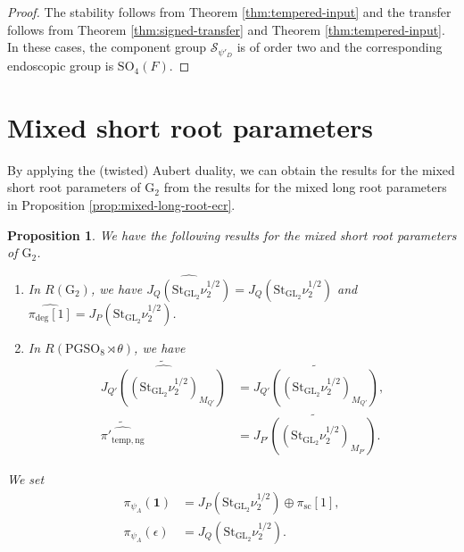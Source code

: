 \documentclass[12pt]{amsart}
\theoremstyle{definition}
\theoremstyle{plain}
\newtheorem{proposition}[definition]{Proposition}
\theoremstyle{remark}
\def\GL{\mathrm{GL}}
\def\SO{\mathrm{SO}}
\def\PGSO{\mathrm{PGSO}}
\newcommand{\cS}{\mathcal{S}}
\numberwithin{equation}{section}
\newcommand{\temp}{\mathrm{temp}}
\newcommand{\rG}{\mathrm{G}}
\newcommand{\St}{\mathrm{St}}
\begin{document}
\begin{proof}
      The stability follows from Theorem \ref{thm:tempered-input} and the transfer follows from Theorem \ref{thm:signed-transfer} and Theorem \ref{thm:tempered-input}.
      In these cases, the component group $\cS_{\psi'_D}$ is of order two and the corresponding endoscopic group is $\SO_4(F)$.
\end{proof}

\section{Mixed short root parameters}\label{sec:mixed-short}

By applying the (twisted) Aubert duality, we can obtain the results for the mixed short root parameters of ${\rG_2}$ from the results for the mixed long root parameters in Proposition \ref{prop:mixed-long-root-ecr}.

\begin{proposition}\label{prop:mixed-short-root-trivial-ecr}
      We have the following results for the mixed short root parameters of ${\rG_2}$.
      \begin{enumerate}
            \item 
            In $R(\rG_2)$, we have 
            $\widehat{J_Q(\St_{\GL_2}\nu_2^{1/2})} = J_Q(\St_{\GL_2}\nu_2^{1/2})$ 
            and
            $\widehat{\pi_{\deg}[1]} = J_P(\St_{\GL_2}\nu_2^{1/2})$.
            \item 
            In $R(\PGSO_8 \rtimes \theta)$, we have 
            \begin{align*}
                  \widetilde{\widehat{J_{Q'}((\St_{\GL_2} \nu_2^{1/2})_{M_{Q'}})}}
                  &= 
                  \widetilde{J_{Q'}((\St_{\GL_2} \nu_2^{1/2})_{M_{Q'}})}, \\
                  \widetilde{\widehat{\pi'_{\temp, \mathrm{ng}}}}
                  &= 
                  \widetilde{J_{P'}((\St_{\GL_2}\nu_2^{1/2})_{M_{P'}})}.
            \end{align*}
      \end{enumerate}
      
      We set 
      \begin{align*}
            \pi_{\psi_A}(\mathbf{1}) &= J_P(\St_{\GL_2}\nu_2^{1/2}) \oplus \pi_{\mathrm{sc}}[1], \\
            \pi_{\psi_A}(\epsilon) &= J_Q(\St_{\GL_2}\nu_2^{1/2}).
      \end{align*}
\end{proposition}
\end{document}
